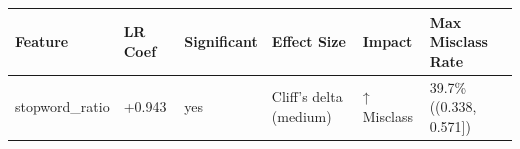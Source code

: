 \begin{tabular}{llllll}
\toprule
Feature & LR Coef & Significant & Effect Size & Impact & Max Misclass Rate \\
\midrule
stopword\_ratio & +0.943 & yes & Cliff's delta (medium) & ↑ Misclass & 39.7\% ((0.338, 0.571]) \\
\bottomrule
\end{tabular}
